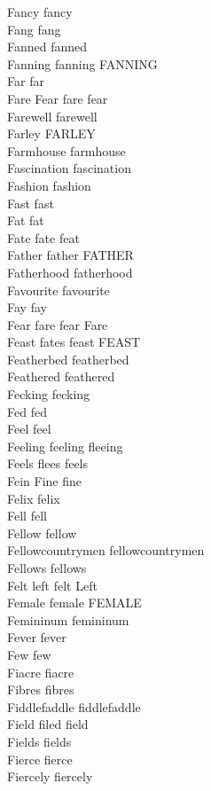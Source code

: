 Fancy fancy\\
Fang fang\\
Fanned fanned\\
Fanning fanning FANNING\\
Far far\\
Fare Fear fare fear\\
Farewell farewell\\
Farley FARLEY\\
Farmhouse farmhouse\\
Fascination fascination\\
Fashion fashion\\
Fast fast\\
Fat fat\\
Fate fate feat\\
Father father FATHER\\
Fatherhood fatherhood\\
Favourite favourite\\
Fay fay\\
Fear fare fear Fare\\
Feast fates feast FEAST\\
Featherbed featherbed\\
Feathered feathered\\
Fecking fecking\\
Fed fed\\
Feel feel\\
Feeling feeling fleeing\\
Feels flees feels\\
Fein Fine fine\\
Felix felix\\
Fell fell\\
Fellow fellow\\
Fellowcountrymen fellowcountrymen\\
Fellows fellows\\
Felt left felt Left\\
Female female FEMALE\\
Femininum femininum\\
Fever fever\\
Few few\\
Fiacre fiacre\\
Fibres fibres\\
Fiddlefaddle fiddlefaddle\\
Field filed field\\
Fields fields\\
Fierce fierce\\
Fiercely fiercely\\
